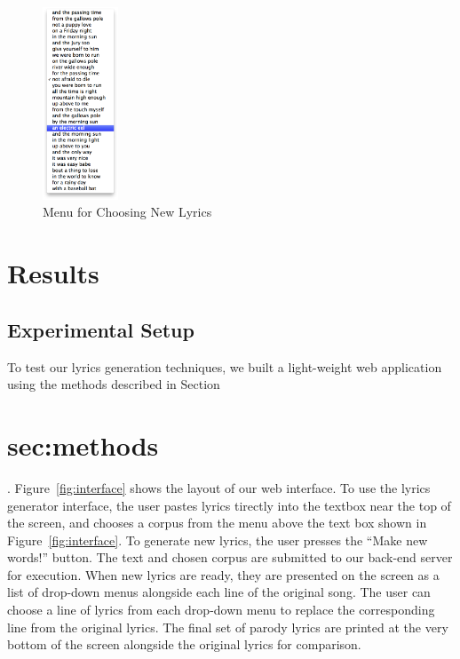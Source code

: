\documentclass{vgtc}                          %
\begin{document}
\begin{figure}%
\centering
\includegraphics[width=0.2\textwidth]{images/png/choose_lyrics_menu.png}
\caption{Menu for Choosing New Lyrics}
\label{fig:lyrics-menu}
\end{figure}


\section{Results}
\label{sec:results}

\subsection{Experimental Setup}
To test our lyrics generation techniques, we built a light-weight
web application using the methods described in Section~\section{sec:methods}.
Figure~\ref{fig:interface} shows the layout of our web interface.
To use the lyrics generator interface, the user pastes lyrics tirectly
into the textbox near the top of the screen, and chooses a corpus
from the menu above the text box shown in Figure~\ref{fig:interface}. To generate new lyrics, the user
presses the ``Make new words!'' button. The text and chosen
corpus are submitted to our back-end server for execution. When
new lyrics are ready, they are presented on the screen as a
list of drop-down menus alongside each line of the original song.
The user can choose a line of lyrics from each drop-down menu to replace
the corresponding line from the original lyrics.
The final set of parody lyrics are printed at the very bottom of the screen
alongside the original lyrics for comparison.
\end{document}
